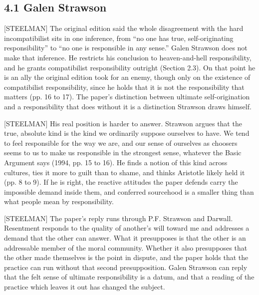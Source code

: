 \documentclass[11pt]{article}
\newcommand{\register}[1]{{\ttfamily\small #1}}
\begin{document}
\subsection*{4.1 Galen Strawson}

\register{[STEELMAN]} The original edition said the whole disagreement with the hard incompatibilist sits in one inference, from ``no one has true, self-originating responsibility'' to ``no one is responsible in any sense.'' Galen Strawson does not make that inference. He restricts his conclusion to heaven-and-hell responsibility, and he grants compatibilist responsibility outright (Section 2.3). On that point he is an ally the original edition took for an enemy, though only on the existence of compatibilist responsibility, since he holds that it is not the responsibility that matters (pp. 16 to 17). The paper's distinction between ultimate self-origination and a responsibility that does without it is a distinction Strawson draws himself.

\register{[STEELMAN]} His real position is harder to answer. Strawson argues that the true, absolute kind is the kind we ordinarily suppose ourselves to have. We tend to feel responsible for the way we are, and our sense of ourselves as choosers seems to us to make us responsible in the strongest sense, whatever the Basic Argument says (1994, pp. 15 to 16). He finds a notion of this kind across cultures, ties it more to guilt than to shame, and thinks Aristotle likely held it (pp. 8 to 9). If he is right, the reactive attitudes the paper defends carry the impossible demand inside them, and conferred sourcehood is a smaller thing than what people mean by responsibility.

\register{[STEELMAN]} The paper's reply runs through P.F. Strawson and Darwall. Resentment responds to the quality of another's will toward me and addresses a demand that the other can answer. What it presupposes is that the other is an addressable member of the moral community. Whether it also presupposes that the other made themselves is the point in dispute, and the paper holds that the practice can run without that second presupposition. Galen Strawson can reply that the felt sense of ultimate responsibility is a datum, and that a reading of the practice which leaves it out has changed the subject.
\end{document}
